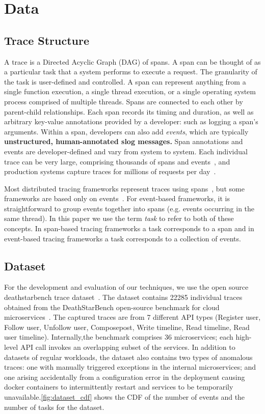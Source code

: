 \section{Data}
\label{sec:data}

\subsection{Trace Structure}

A trace is a Directed Acyclic Graph (DAG) of spans. A span can be thought
of as a particular task that a system performs to execute a request. The granularity of the task
is user-defined and controlled. A span can represent anything from a single function execution, 
a single thread execution, or a single operating system process comprised of multiple threads.
Spans are connected to each other by parent-child relationships. 
Each span records its timing and duration, as well as arbitrary key-value annotations provided by a developer: such as logging a span's arguments.
Within a span, developers can also add \emph{events}, which are typically \textbf{unstructured, human-annotated slog messages.}
Span annotations and events are developer-defined and vary from system to system.
Each individual trace can be very large, comprising thousands of spans and events~\cite{kaldor2017canopy, las2019sifter, shkurographdiffviz}, and production systems capture traces for millions of requests per day~\cite{kaldor2017canopy}.

Most distributed tracing frameworks represent traces using spans~\cite{jaeger,opentelemetry,sigelman2010dapper}, but some frameworks are based only on events~\cite{fonseca2007xtrace}.  
For event-based frameworks, it is straightforward to group events together into spans (e.g. events occurring in the same thread). 
In this paper we use the term \emph{task} to refer to both of these concepts. In span-based tracing frameworks a task corresponds to a span and in event-based tracing
frameworks a task corresponds to a collection of events.

\subsection{Dataset}

For the development and evaluation of our techniques, we use the open source deathstarbench trace dataset~\cite{anand2019deathstarbenchtraces}.
The dataset contains 22285 individual traces obtained from the DeathStarBench open-source benchmark for cloud microservices~\cite{gan2019deathstar}.
The captured traces are from 7 different API types (Register user, Follow user, Unfollow user, Composepost, Write timeline, Read timeline, Read user timeline). 
Internally,the benchmark comprises 36 microservices; each high-level API call invokes an overlapping subset of the services. In addition to datasets of regular workloads, the dataset also
contains two types of anomalous traces: one with manually triggered exceptions in the internal microservices; and one arising accidentally from a configuration error in the 
deployment causing docker containers to intermittently restart and services to be temporarily unavailable.\autoref{fig:dataset_cdf} shows the CDF of the number of events
and the number of tasks for the dataset.